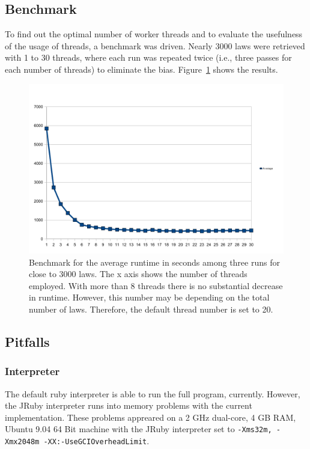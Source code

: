 \documentclass{scrartcl}
\begin{document}
\subsection{Benchmark}
To find out the optimal number of worker threads and to evaluate the usefulness of the usage of threads, a benchmark was driven. Nearly 3000 laws were retrieved with 1 to 30 threads, where each run was repeated twice (i.e., three passes for each number of threads) to eliminate the bias. Figure~\ref{fig:benchmark} shows the results.

\begin{figure}[ht]
\begin{center}
\includegraphics[width = \textwidth]{benchmark}
\caption{Benchmark for the average runtime in seconds among three runs for close to 3000 laws. The x axis shows the number of threads employed. With more than 8 threads there is no substantial decrease in runtime. However, this number may be depending on the total number of laws. Therefore, the default thread number is set to 20.}
\label{fig:benchmark}
\end{center}
\end{figure}

\subsection{Pitfalls}
\subsubsection{Interpreter}
The default ruby interpreter is able to run the full program, currently. However, the JRuby interpreter runs into memory problems with the current implementation. These problems appreared on a 2 GHz dual-core, 4 GB RAM, Ubuntu 9.04 64 Bit machine with the JRuby interpreter set to \texttt{-Xms32m, -Xmx2048m -XX:-UseGCIOverheadLimit}.
\end{document}
